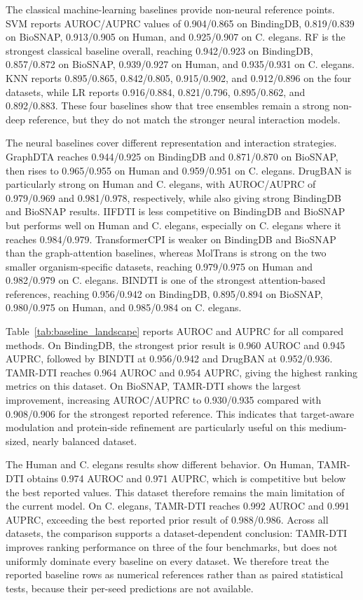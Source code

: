 The classical machine-learning baselines provide non-neural reference points. SVM reports AUROC/AUPRC values of 0.904/0.865 on BindingDB, 0.819/0.839 on BioSNAP, 0.913/0.905 on Human, and 0.925/0.907 on C. elegans. RF is the strongest classical baseline overall, reaching 0.942/0.923 on BindingDB, 0.857/0.872 on BioSNAP, 0.939/0.927 on Human, and 0.935/0.931 on C. elegans. KNN reports 0.895/0.865, 0.842/0.805, 0.915/0.902, and 0.912/0.896 on the four datasets, while LR reports 0.916/0.884, 0.821/0.796, 0.895/0.862, and 0.892/0.883. These four baselines show that tree ensembles remain a strong non-deep reference, but they do not match the stronger neural interaction models.

The neural baselines cover different representation and interaction strategies. GraphDTA reaches 0.944/0.925 on BindingDB and 0.871/0.870 on BioSNAP, then rises to 0.965/0.955 on Human and 0.959/0.951 on C. elegans. DrugBAN is particularly strong on Human and C. elegans, with AUROC/AUPRC of 0.979/0.969 and 0.981/0.978, respectively, while also giving strong BindingDB and BioSNAP results. IIFDTI is less competitive on BindingDB and BioSNAP but performs well on Human and C. elegans, especially on C. elegans where it reaches 0.984/0.979. TransformerCPI is weaker on BindingDB and BioSNAP than the graph-attention baselines, whereas MolTrans is strong on the two smaller organism-specific datasets, reaching 0.979/0.975 on Human and 0.982/0.979 on C. elegans. BINDTI is one of the strongest attention-based references, reaching 0.956/0.942 on BindingDB, 0.895/0.894 on BioSNAP, 0.980/0.975 on Human, and 0.985/0.984 on C. elegans.

Table~\ref{tab:baseline_landscape} reports AUROC and AUPRC for all compared methods. On BindingDB, the strongest prior result is 0.960 AUROC and 0.945 AUPRC, followed by BINDTI at 0.956/0.942 and DrugBAN at 0.952/0.936. TAMR-DTI reaches 0.964 AUROC and 0.954 AUPRC, giving the highest ranking metrics on this dataset. On BioSNAP, TAMR-DTI shows the largest improvement, increasing AUROC/AUPRC to 0.930/0.935 compared with 0.908/0.906 for the strongest reported reference. This indicates that target-aware modulation and protein-side refinement are particularly useful on this medium-sized, nearly balanced dataset.

The Human and C. elegans results show different behavior. On Human, TAMR-DTI obtains 0.974 AUROC and 0.971 AUPRC, which is competitive but below the best reported values. This dataset therefore remains the main limitation of the current model. On C. elegans, TAMR-DTI reaches 0.992 AUROC and 0.991 AUPRC, exceeding the best reported prior result of 0.988/0.986. Across all datasets, the comparison supports a dataset-dependent conclusion: TAMR-DTI improves ranking performance on three of the four benchmarks, but does not uniformly dominate every baseline on every dataset. We therefore treat the reported baseline rows as numerical references rather than as paired statistical tests, because their per-seed predictions are not available.

